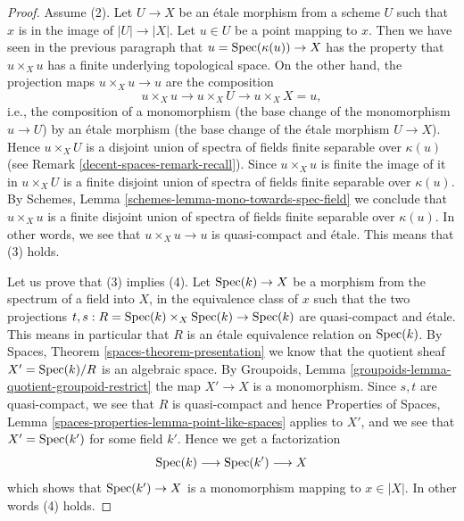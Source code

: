 \begin{proof}
\medskip\noindent
Assume (2). Let $U \to X$ be an \'etale morphism from a scheme $U$
such that $x$ is in the image of $|U| \to |X|$. Let $u \in U$ be
a point mapping to $x$. Then we have seen in the previous
paragraph that $u = \operatorname{Spec}(\kappa(u)) \to X$ has the property that
$u \times_X u$ has a finite underlying topological space. On the other
hand, the projection maps $u \times_X u \to u$ are the composition
$$
u \times_X u \longrightarrow
u \times_X U \longrightarrow
u \times_X X = u,
$$
i.e., the composition of a monomorphism (the base change of the monomorphism
$u \to U$) by an \'etale morphism (the base change of the \'etale morphism
$U \to X$). Hence $u \times_X U$ is a disjoint union of spectra of fields
finite separable over $\kappa(u)$ (see
Remark \ref{decent-spaces-remark-recall}). Since $u \times_X u$ is finite the image
of it in $u \times_X U$ is a finite disjoint union of spectra of fields
finite separable over $\kappa(u)$. By
Schemes, Lemma \ref{schemes-lemma-mono-towards-spec-field}
we conclude that $u \times_X u$ is a finite disjoint union of spectra
of fields finite separable over $\kappa(u)$. In other words, we see that
$u \times_X u \to u$ is quasi-compact and \'etale. This means that (3) holds.

\medskip\noindent
Let us prove that (3) implies (4). Let $\operatorname{Spec}(k) \to X$ be a morphism
from the spectrum of a field into $X$, in the equivalence class of $x$
such that the two projections
$t, s : R = \operatorname{Spec}(k) \times_X \operatorname{Spec}(k)  \to \operatorname{Spec}(k)$
are quasi-compact and \'etale.
This means in particular
that $R$ is an \'etale equivalence relation on $\operatorname{Spec}(k)$.
By Spaces, Theorem \ref{spaces-theorem-presentation}
we know that the quotient sheaf
$X' = \operatorname{Spec}(k)/R$ is an algebraic space. By
Groupoids, Lemma \ref{groupoids-lemma-quotient-groupoid-restrict}
the map $X' \to X$ is a monomorphism.
Since $s, t$ are quasi-compact, we see that $R$ is quasi-compact and hence
Properties of Spaces,
Lemma \ref{spaces-properties-lemma-point-like-spaces}
applies to $X'$, and we see that
$X' = \operatorname{Spec}(k')$ for some field $k'$. Hence we get a factorization
$$
\operatorname{Spec}(k) \longrightarrow
\operatorname{Spec}(k') \longrightarrow X
$$
which shows that $\operatorname{Spec}(k') \to X$ is a monomorphism mapping
to $x \in |X|$. In other words (4) holds.


\end{proof}
